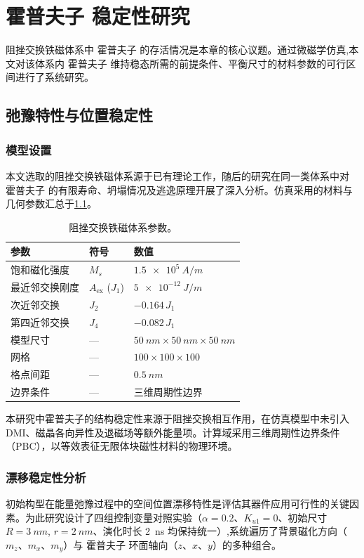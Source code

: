 \chapter{霍普夫子 稳定性研究}

阻挫交换铁磁体系中 霍普夫子 的存活情况是本章的核心议题。通过微磁学仿真,本文对该体系内 霍普夫子 维持稳态所需的前提条件、平衡尺寸的材料参数的可行区间进行了系统研究。

\section{弛豫特性与位置稳定性}

\subsection{模型设置}
本文选取的阻挫交换铁磁体系源于已有理论工作\cite{sallermann2023stability}，随后的研究在同一类体系中对 霍普夫子 的有限寿命、坍塌情况及逃逸原理开展了深入分析\cite{lobanov2023lifetime}。仿真采用的材料与几何参数汇总于\cref{tab:frustrated-params}。

\begin{table}[htbp]
  \centering
  \caption{阻挫交换铁磁体系参数。}
  \label{tab:frustrated-params}
  \begin{tabular}{lll}
    \toprule
    参数 & 符号 & 数值 \\
    \midrule
    饱和磁化强度 & $M_s$ & $\SI{1.5e5}{A/m}$ \\
    最近邻交换刚度 & $A_{\text{ex}}$ ($J_1$) & $\SI{5e-12}{J/m}$ \\
    次近邻交换 & $J_2$ & $-0.164 \, J_1$ \\
    第四近邻交换 & $J_4$ & $-0.082 \, J_1$ \\
    模型尺寸 & — & $\SI{50}{nm} \times \SI{50}{nm} \times \SI{50}{nm}$ \\
    网格 & — & $100 \times 100 \times 100$ \\
    格点间距 & — & $\SI{0.5}{nm}$ \\
    边界条件 & — & 三维周期性边界 \\
    \bottomrule
  \end{tabular}
\end{table}

本研究中霍普夫子的结构稳定性来源于阻挫交换相互作用，在仿真模型中未引入 DMI、磁晶各向异性及退磁场等额外能量项。计算域采用三维周期性边界条件（PBC），以等效表征无限体块磁性材料的物理环境。

\subsection{漂移稳定性分析}
初始构型在能量弛豫过程中的空间位置漂移特性是评估其器件应用可行性的关键因素。为此研究设计了四组控制变量对照实验（$\alpha = 0.2$、$K_{u1} = 0$、初始尺寸 $R = \SI{3}{nm}$, $r = \SI{2}{nm}$、演化时长 \SI{2}{ns} 均保持统一）,系统遍历了背景磁化方向（$m_z$、$m_x$、$m_y$）与 霍普夫子 环面轴向（$z$、$x$、$y$）的多种组合。

